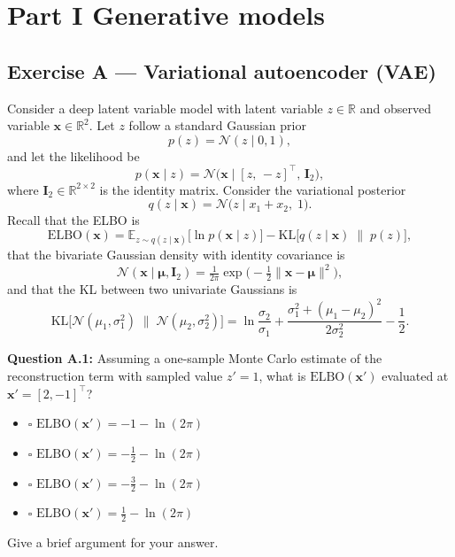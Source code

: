 \documentclass[12pt,a4paper]{article}
\newcommand{\N}{\mathcal{N}}
\newcommand{\KL}{\mathrm{KL}}
\newcommand{\E}{\mathbb{E}}
\newcommand{\ELBO}{\mathrm{ELBO}}
\begin{document}
\newpage
\section*{Part I \quad Generative models}

\subsection*{Exercise A --- Variational autoencoder (VAE)}

Consider a deep latent variable model with latent variable $z\in\mathbb{R}$ and observed variable
$\mathbf{x}\in\mathbb{R}^2$.  Let $z$ follow a standard Gaussian prior
\[
  p(z) = \N(z\mid 0, 1),
\]
and let the likelihood be
\[
  p(\mathbf{x}\mid z) = \N\!\bigl(\mathbf{x}\mid [z,\,-z]^\top,\, \mathbf{I}_2\bigr),
\]
where $\mathbf{I}_2\in\mathbb{R}^{2\times 2}$ is the identity matrix.  Consider the variational
posterior
\[
  q(z\mid\mathbf{x}) = \N\!\bigl(z\mid x_1 + x_2,\; 1\bigr).
\]
Recall that the ELBO is
\[
  \ELBO(\mathbf{x}) = \E_{z\sim q(z\mid\mathbf{x})}\!\bigl[\ln p(\mathbf{x}\mid z)\bigr]
    - \KL\!\bigl[q(z\mid\mathbf{x})\;\|\; p(z)\bigr], \tag{1}
\]
that the bivariate Gaussian density with identity covariance is
\[
  \N(\mathbf{x}\mid\boldsymbol{\mu},\mathbf{I}_2)
    = \tfrac{1}{2\pi}\exp\!\bigl(-\tfrac{1}{2}\|\mathbf{x}-\boldsymbol{\mu}\|^2\bigr), \tag{2}
\]
and that the KL between two univariate Gaussians is
\[
  \KL\!\bigl[\N(\mu_1,\sigma_1^2)\;\|\;\N(\mu_2,\sigma_2^2)\bigr]
    = \ln\frac{\sigma_2}{\sigma_1}
      + \frac{\sigma_1^2 + (\mu_1-\mu_2)^2}{2\sigma_2^2} - \frac{1}{2}. \tag{3}
\]

\textbf{Question A.1:} Assuming a one-sample Monte Carlo estimate of the reconstruction term
with sampled value $z'=1$, what is $\ELBO(\mathbf{x}')$ evaluated at $\mathbf{x}'=[2,-1]^\top$?

\begin{itemize}[noitemsep,label={}]
  \item[\textbf{A}] $\square$ \quad $\ELBO(\mathbf{x}') = -1 - \ln(2\pi)$
  \item[\textbf{B}] $\square$ \quad $\ELBO(\mathbf{x}') = -\tfrac{1}{2} - \ln(2\pi)$
  \item[\textbf{C}] $\square$ \quad $\ELBO(\mathbf{x}') = -\tfrac{3}{2} - \ln(2\pi)$
  \item[\textbf{D}] $\square$ \quad $\ELBO(\mathbf{x}') = \tfrac{1}{2} - \ln(2\pi)$
\end{itemize}

Give a brief argument for your answer.
\end{document}
